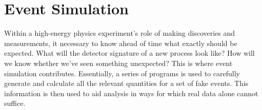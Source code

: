\chapter{Event Simulation}
\label{sim}










Within %
a high-energy physics experiment's role of making 
discoveries and measurements, 
it necessary to know ahead of time what exactly 
should be expected. 
What will the detector signature of a new process look like? 
How will we know whether we've seen something unexpected? 
This is where event simulation contributes.  
Essentially, a series of programs is used to carefully 
generate and calculate all the relevant quantities for a set of 
fake events.  
This information is then used 
to aid analysis in ways for which 
real data alone cannot suffice.  

